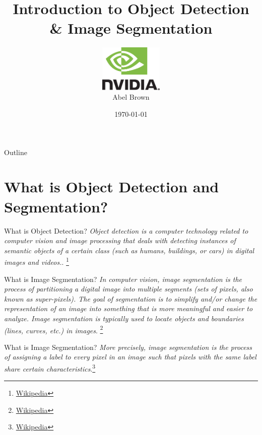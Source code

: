 \documentclass[handout]{beamer}
\title{Introduction to Object Detection \\ \& Image Segmentation}
\author{
	\includegraphics[width=3cm]{../media/logo/NVLogo_2D.eps}
	\vspace{0.75cm}
	\\Abel Brown}
\date{\today}
\begin{document}
\frame{\titlepage}

\begin{frame}{Outline}
\tableofcontents
\end{frame}




\section{What is Object Detection and Segmentation?}
\begin{frame}{What is Object Detection?}
\emph{Object detection is a computer technology related to computer vision and image processing that deals with detecting instances of semantic objects of a certain class (such as humans, buildings, or cars) in digital images and videos.}. \footnote{\href{https://en.wikipedia.org/wiki/Object_detection}{\color{blue}Wikipedia}}
\end{frame}

\begin{frame}{What is Image Segmentation?}
\emph{In computer vision, image segmentation is the process of partitioning a digital image into multiple segments (sets of pixels, also known as super-pixels). The goal of segmentation is to simplify and/or change the representation of an image into something that is more meaningful and easier to analyze.  Image segmentation is typically used to locate objects and boundaries (lines, curves, etc.) in images}. \footnote{\href{https://en.wikipedia.org/wiki/Image_segmentation}{\color{blue}Wikipedia}}
\end{frame}

\begin{frame}{What is Image Segmentation?}
\emph{More precisely, image segmentation is the process of assigning a label to every pixel in an image such that pixels with the same label share certain characteristics}.\footnote{\href{https://en.wikipedia.org/wiki/Image_segmentation}{\color{blue}Wikipedia}}
\end{frame}
\end{document}
